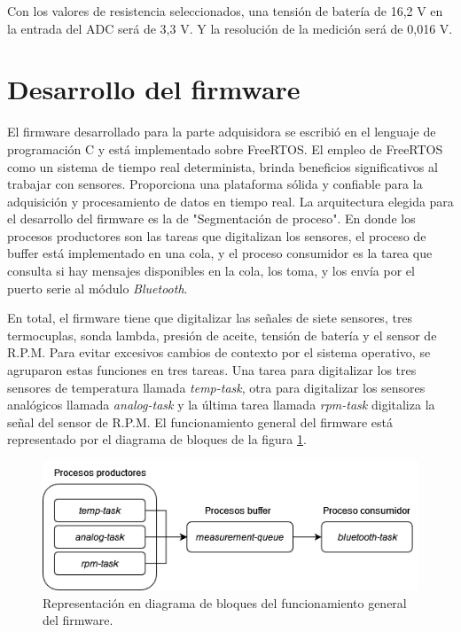 Con los valores de resistencia seleccionados, una tensión de batería de 16,2 V en la entrada del ADC será de 3,3 V. Y la resolución de la medición será de 0,016 V.

\break

\section{Desarrollo del firmware}

El firmware desarrollado para la parte adquisidora se escribió en el lenguaje de programación C y está implementado sobre FreeRTOS. El empleo de FreeRTOS como un sistema de tiempo real determinista, brinda beneficios significativos al trabajar con sensores. Proporciona una plataforma sólida y confiable para la adquisición y procesamiento de datos en tiempo real. La arquitectura elegida para el desarrollo del firmware es la de "Segmentación de proceso". En donde los procesos productores son las tareas que digitalizan los sensores, el proceso de buffer está implementado en una cola, y el proceso consumidor es la tarea que consulta si hay mensajes disponibles en la cola, los toma, y los envía por el puerto serie al módulo \textit{Bluetooth}.

En total, el firmware tiene que digitalizar las señales de siete sensores, tres termocuplas, sonda lambda, presión de aceite, tensión de batería y el sensor de R.P.M. Para evitar excesivos cambios de contexto por el sistema operativo, se agruparon estas funciones en tres tareas. Una tarea para digitalizar los tres sensores de temperatura llamada \textit{temp-task}, otra para digitalizar los sensores analógicos llamada \textit{analog-task} y la última tarea llamada \textit{rpm-task} digitaliza la señal del sensor de R.P.M. El funcionamiento general del firmware está representado por el diagrama de bloques de la figura \ref{fig:diagrama-firmware}.

\begin{figure}[htpb]
\centering
\includegraphics[width=.8\textwidth]{./Figures/diagrama-firmware.png}
\caption{Representación en diagrama de bloques del funcionamiento general del firmware.}
\label{fig:diagrama-firmware}
\end{figure}

